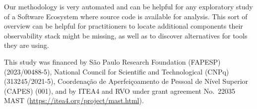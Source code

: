 \documentclass[sigconf]{acmart}
\begin{document}
Our methodology is very automated and can be helpful for any exploratory
study of a Software Ecosystem where source code is available for
analysis. This sort of overview can be helpful for practitioners to
locate additional components their observability stack might be missing,
as well as to discover alternatives for tools they are using.

\begin{acks}

This study was financed by São Paulo Research Foundation (FAPESP)
(2023/00488-5), National Council for Scientific and Technological (CNPq)
(313245/2021-5), Coordenação de Aperfeiçoamento de Pessoal de Nível Superior
(CAPES) (001), and by ITEA4 and RVO under grant agreement No.~22035 MAST
(\url{https://itea4.org/project/mast.html}).

\end{acks}




\appendix
\end{document}

